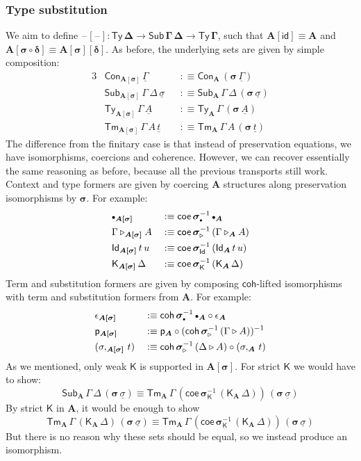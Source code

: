\documentclass[12pt,a4paper,twoside,openany]{book}
\theoremstyle{remark}
\theoremstyle{definition}
\theoremstyle{theorem}
\newcommand{\bs}[1]{\boldsymbol{#1}}
\newcommand{\id}{\mathsf{id}}
\newcommand{\Con}{\mathsf{Con}}
\newcommand{\Sub}{\mathsf{Sub}}
\newcommand{\Tm}{\mathsf{Tm}}
\newcommand{\Ty}{\mathsf{Ty}}
\newcommand{\Id}{\mathsf{Id}}
\newcommand{\blank}{\mathord{\hspace{1pt}\text{--}\hspace{1pt}}}
\newcommand{\ra}{\rightarrow}
\newcommand{\ext}{\triangleright}
\newcommand{\emptycon}{\scaleobj{.75}\bullet}
\newcommand{\p}{\mathsf{p}}
\newcommand{\K}{\mathsf{K}}
\newcommand{\bsigma}{\bs{\sigma}}
\newcommand{\bA}{\bs{A}}
\newcommand{\ul}[1]{\underline{#1}}
\newcommand{\ulGamma}{\ul{\Gamma}}
\newcommand{\ulsigma}{\ul{\sigma}}
\newcommand{\ult}{\ul{t}}
\newcommand{\ulA}{\ul{A}}
\newcommand{\coe}{\mathsf{coe}}
\newcommand{\coh}{\mathsf{coh}}
\newcommand{\defn}{:\equiv}
\begin{document}
\subsubsection{Type substitution}
We aim to define $\bs{\blank[\blank] : \Ty\,\Delta \ra \Sub\,\Gamma\,\Delta \ra
  \Ty\,\Gamma}$, such that $\bs{A[\id]} \equiv \bA$ and $\bs{A[\sigma\circ\delta]} \equiv
\bs{A[\sigma][\delta]}$. As before, the underlying sets are given by simple
composition:
\begin{alignat*}{3}
  & \Con_{\bs{A[\sigma]}}\,\ulGamma && \defn \Con_{\bA}\,(\bsigma\,\ulGamma)\\
  & \Sub_{\bs{A[\sigma]}}\,\Gamma\,\Delta\,\ulsigma && \defn
    \Sub_{\bA}\,\Gamma\,\Delta\,(\bsigma\,\ulsigma)\\
  & \Ty_{\bs{A[\sigma]}}\,\Gamma\,\ulA && \defn
      \Ty_{\bA}\,\Gamma\,(\bsigma\,\ulA)\\
  & \Tm_{\bs{A[\sigma]}}\,\Gamma\,A\,\ult && \defn
      \Tm_{\bA}\,\Gamma\,A\,(\bsigma\,\ult)
\end{alignat*}
The difference from the finitary case is that instead of preservation equations,
we have isomorphisms, coercions and coherence. However, we can recover
essentially the same reasoning as before, because all the previous transports
still work. Context and type formers are given by coercing $\bA$ structures
along preservation isomorphisms by $\bsigma$. For example:
\begin{alignat*}{3}
  &\emptycon_{\bs{A[\sigma]}} && \defn
    \coe\,\bsigma_{\emptycon}^{-1}\,\emptycon_{\bA}\\
  &\Gamma\ext_{\bs{A[\sigma]}}A && \defn
    \coe\,\bsigma_{\ext}^{-1}\,(\Gamma\ext_{\bA} A)\\
  &\Id_{\bs{A[\sigma]}}\,t\,u && \defn
    \coe\,\bsigma_{\Id}^{-1}\,(\Id_{\bA}\,t\,u)\\
  &\K_{\bs{A[\sigma]}}\,\Delta && \defn
    \coe\,\bsigma_{\K}^{-1}\,(\K_{\bA}\,\Delta)
\end{alignat*}
Term and substitution formers are given by composing $\coh$-lifted
isomorphisms with term and substitution formers from $\bA$. For example:
\begin{alignat*}{3}
  & \epsilon_{\bs{A[\sigma]}} && \defn
    \coh\,\bsigma_{\emptycon}^{-1}\,\emptycon_{\bA} \circ \epsilon_{\bA}\\
  & \p_{\bs{A[\sigma]}} && \defn
    \p_{\bA} \circ (\coh\,\bsigma_{\ext}^{-1}\,(\Gamma\ext A))^{-1}\\
  & (\sigma,_{\bs{A[\sigma]}}\,t) && \defn \coh\,\bsigma_{\ext}^{-1}\,(\Delta\ext A) \circ (\sigma,_{\bA}\,t)
\end{alignat*}
As we mentioned, only weak $\K$ is supported in $\bs{A[\sigma]}$. For strict $\K$
we would have to show:
\[
\Sub_{\bA}\,\Gamma\,\Delta\,(\bsigma\,\ulsigma)
\equiv \Tm_{\bA}\,\Gamma\,(\coe\,\bsigma_{\K}^{-1}\,(\K_{\bA}\,\Delta))\,(\bsigma\,\ulsigma)
\]
By strict $\K$ in $\bA$, it would be enough to show
\[
\Tm_{\bA}\,\Gamma\,(\K_{\bA}\,\Delta)\,(\bsigma\,\ulsigma)
\equiv \Tm_{\bA}\,\Gamma\,(\coe\,\bsigma_{\K}^{-1}\,(\K_{\bA}\,\Delta))\,(\bsigma\,\ulsigma)
\]
But there is no reason why these sets should be equal, so we instead produce an isomorphism.
\end{document}
